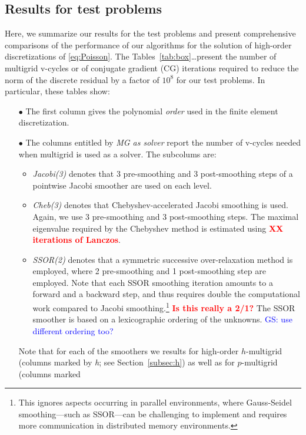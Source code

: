 \documentclass[smallcondensed,final]{svjour3}     %
\newcommand{\todo}[1]{\textcolor{red}{\bf #1}}
\newcommand{\gsnote}[1]{\textcolor{blue}{GS: #1}}
\begin{document}
\subsection{Results for test problems}\label{subsec:results}
Here, we summarize our results for the test problems and present
comprehensive comparisons of the performance of our algorithms for the
solution of high-order discretizations of \eqref{eq:Poisson}.  The
Tables~\ref{tab:box}\ldots present the number of multigrid v-cycles or
of conjugate gradient (CG) iterations required to reduce the norm of
the discrete residual by a factor of $10^8$ for our test problems. In
particular, these tables show:
\begin{itemize}
\item[$\bullet$] The first column gives the polynomial \emph{order}
  used in the finite element discretization.
\item[$\bullet$] The columns entitled by \emph{MG as solver} report
  the number of v-cycles needed when multigrid is used as a
  solver. The subcolums are:
  \begin{itemize}
  \item \emph{Jacobi(3)} denotes that 3 pre-smoothing and 3
    post-smoothing steps of a pointwise Jacobi smoother are used on
    each level.
  \item \emph{Cheb(3)} denotes that Chebyshev-accelerated Jacobi
    smoothing is used. Again, we use 3 pre-smoothing and 3
    post-smoothing steps. The maximal eigenvalue required by the
    Chebyshev method is estimated using \todo{XX iterations of
      Lanczos}.
  \item \emph{SSOR(2)} denotes that a symmetric successive
    over-relaxation method is employed, where 2 pre-smoothing and 1
    post-smoothing step are employed. Note that each SSOR smoothing
    iteration amounts to a forward and a backward step, and thus
    requires double the computational work compared to Jacobi
    smoothing.\footnote{This ignores aspects occurring in parallel
      environments, where Gauss-Seidel smoothing---such as SSOR---can
      be challenging to implement and requires more communication in
      distributed memory environments.}  \todo{Is this really a
      2/1?}  The SSOR smoother is based on a lexicographic ordering of
    the unknowns. \gsnote{use different ordering too?}
  \end{itemize}
  Note that for each of the smoothers we results for high-order
  $h$-multigrid (columns marked by \emph{h}; see
  Section~\ref{subsec:h}) as well as for $p$-multigrid (columns marked

\end{itemize}
\end{document}
